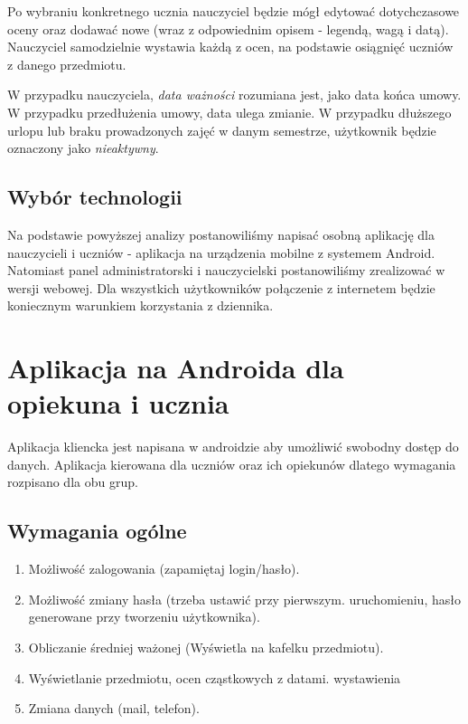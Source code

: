 \documentclass[12pt, titlepage]{article}
\begin{document}
Po wybraniu konkretnego ucznia nauczyciel będzie mógł edytować dotychczasowe oceny oraz dodawać nowe (wraz z odpowiednim opisem - legendą, wagą i datą). Nauczyciel samodzielnie wystawia każdą z ocen, na podstawie osiągnięć uczniów z danego przedmiotu.

W przypadku nauczyciela, \textit{data ważności} rozumiana jest, jako data końca umowy. W przypadku przedłużenia umowy, data ulega zmianie. W przypadku dłuższego urlopu lub braku prowadzonych zajęć w danym semestrze, użytkownik będzie oznaczony jako \textit{nieaktywny}.

\subsection{Wybór technologii}

Na podstawie powyższej analizy postanowiliśmy napisać osobną aplikację dla nauczycieli i uczniów - aplikacja na urządzenia mobilne z systemem Android. Natomiast panel administratorski i nauczycielski postanowiliśmy zrealizować w wersji webowej. 
Dla wszystkich użytkowników połączenie z internetem będzie koniecznym warunkiem korzystania z dziennika.

\section{Aplikacja na Androida dla opiekuna i ucznia}

Aplikacja kliencka jest napisana w androidzie aby umożliwić swobodny dostęp do danych. Aplikacja kierowana dla uczniów oraz ich opiekunów dlatego wymagania rozpisano dla obu grup.

\subsection{Wymagania ogólne}

\begin{enumerate}
 \item Możliwość zalogowania (zapamiętaj login/hasło).
 \item Możliwość zmiany hasła (trzeba ustawić przy pierwszym. uruchomieniu, hasło generowane przy tworzeniu użytkownika).
 \item Obliczanie średniej ważonej (Wyświetla na kafelku przedmiotu).
 \item Wyświetlanie przedmiotu, ocen cząstkowych z datami. wystawienia
 \item Zmiana danych (mail, telefon).
\end{enumerate}
\end{document}
